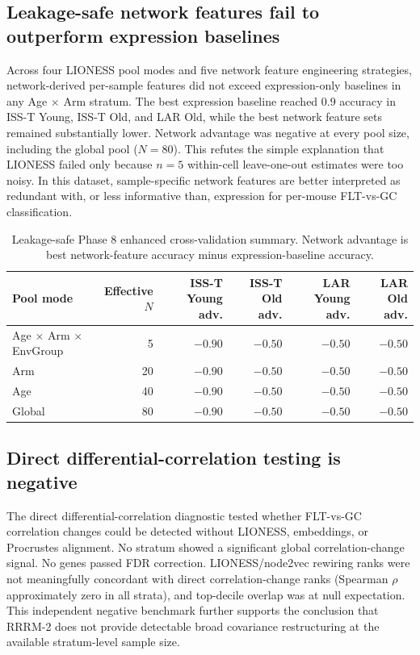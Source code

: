 \documentclass[11pt]{article}
\begin{document}
\subsection{Leakage-safe network features fail to outperform expression baselines}

Across four LIONESS pool modes and five network feature engineering strategies, network-derived per-sample features did not exceed expression-only baselines in any Age $\times$ Arm stratum. The best expression baseline reached 0.9 accuracy in ISS-T Young, ISS-T Old, and LAR Old, while the best network feature sets remained substantially lower. Network advantage was negative at every pool size, including the global pool ($N=80$). This refutes the simple explanation that LIONESS failed only because $n=5$ within-cell leave-one-out estimates were too noisy. In this dataset, sample-specific network features are better interpreted as redundant with, or less informative than, expression for per-mouse FLT-vs-GC classification.

\begin{table}[h]
\centering\small
\begin{tabular}{lrrrrr}
\toprule
Pool mode & Effective $N$ & ISS-T Young adv. & ISS-T Old adv. & LAR Young adv. & LAR Old adv. \\
\midrule
Age $\times$ Arm $\times$ EnvGroup & 5 & $-0.90$ & $-0.50$ & $-0.50$ & $-0.50$ \\
Arm & 20 & $-0.90$ & $-0.50$ & $-0.50$ & $-0.50$ \\
Age & 40 & $-0.90$ & $-0.50$ & $-0.50$ & $-0.50$ \\
Global & 80 & $-0.90$ & $-0.50$ & $-0.50$ & $-0.50$ \\
\bottomrule
\end{tabular}
\caption{Leakage-safe Phase 8 enhanced cross-validation summary. Network advantage is best network-feature accuracy minus expression-baseline accuracy.}
\label{tab:phase8}
\end{table}

\subsection{Direct differential-correlation testing is negative}

The direct differential-correlation diagnostic tested whether FLT-vs-GC correlation changes could be detected without LIONESS, embeddings, or Procrustes alignment. No stratum showed a significant global correlation-change signal. No genes passed FDR correction. LIONESS/node2vec rewiring ranks were not meaningfully concordant with direct correlation-change ranks (Spearman $\rho$ approximately zero in all strata), and top-decile overlap was at null expectation. This independent negative benchmark further supports the conclusion that RRRM-2 does not provide detectable broad covariance restructuring at the available stratum-level sample size.
\end{document}
